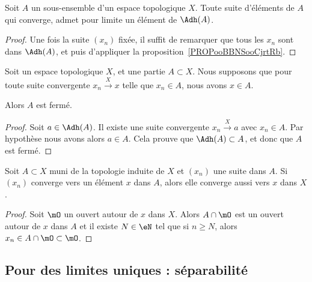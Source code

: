 \begin{corollary}\label{CorLimAbarA}
	Soit \( A \) un sous-ensemble d'un espace topologique \( X\). Toute suite d'éléments de \( A\) qui converge, admet pour limite un élément de \( \Adh(A) \).
\end{corollary}
\begin{proof}
	Une fois la suite \( (x_n) \) fixée, il suffit de remarquer que tous les \( x_n \) sont dans \( \Adh(A) \), et puis d'appliquer la proposition~\ref{PROPooBBNSooCjrtRb}.
\end{proof}

\begin{proposition}	\label{PROPooEXUMooAFbpVJ}
	Soit un espace topologique \( X\), et une partie \( A\subset X\). Nous supposons que pour toute suite convergente \( x_n\stackrel{ X}{\longrightarrow} x\) telle que \( x_n\in A\), nous avons \( x\in A\).

	Alors \( A\) est fermé.
\end{proposition}

\begin{proof}
	Soit \( a\in\Adh(A)\). Il existe une suite convergente \( x_n\stackrel{ X}{\longrightarrow} a\) avec \( x_n\in A\). Par hypothèse nous avons alors \( a\in A\). Cela prouve que \( \Adh(A)\subset A\), et donc que \( A\) est fermé.
\end{proof}


\begin{lemma}   \label{LemPESaiVw}
	Soit \( A\subset X\) muni de la topologie induite de \( X\) et \( (x_n)\) une suite dans \( A\). Si \( (x_n) \) converge vers un élément \( x \) dans \(A \), alors elle converge aussi vers \(x \) dans \( X \).
\end{lemma}

\begin{proof}
	Soit \( \mO\) un ouvert autour de \( x\) dans \( X\). Alors \( A\cap\mO\) est un ouvert autour de \( x\) dans \( A\) et il existe \( N\in \eN\) tel que si \( n\geq N\), alors \( x_n\in A\cap\mO\subset\mO\).
\end{proof}

\subsection{Pour des limites uniques : séparabilité}


